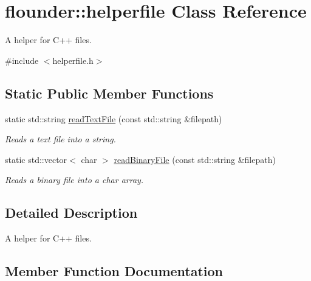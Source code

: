 \hypertarget{classflounder_1_1helperfile}{}\section{flounder\+:\+:helperfile Class Reference}
\label{classflounder_1_1helperfile}


A helper for C++ files.  




{\ttfamily \#include $<$helperfile.\+h$>$}

\subsection*{Static Public Member Functions}
\begin{DoxyCompactItemize}
\item 
static std\+::string \hyperlink{classflounder_1_1helperfile_a4f9da9404d2e3e7b7f1453ede0c5ab24}{read\+Text\+File} (const std\+::string \&filepath)
\begin{DoxyCompactList}\small\item\em Reads a text file into a string. \end{DoxyCompactList}\item 
static std\+::vector$<$ char $>$ \hyperlink{classflounder_1_1helperfile_aed36c69790790f1f867bd39c01194a11}{read\+Binary\+File} (const std\+::string \&filepath)
\begin{DoxyCompactList}\small\item\em Reads a binary file into a char array. \end{DoxyCompactList}\end{DoxyCompactItemize}


\subsection{Detailed Description}
A helper for C++ files. 



\subsection{Member Function Documentation}
\mbox{\label{classflounder_1_1helperfile_aed36c69790790f1f867bd39c01194a11}} 
